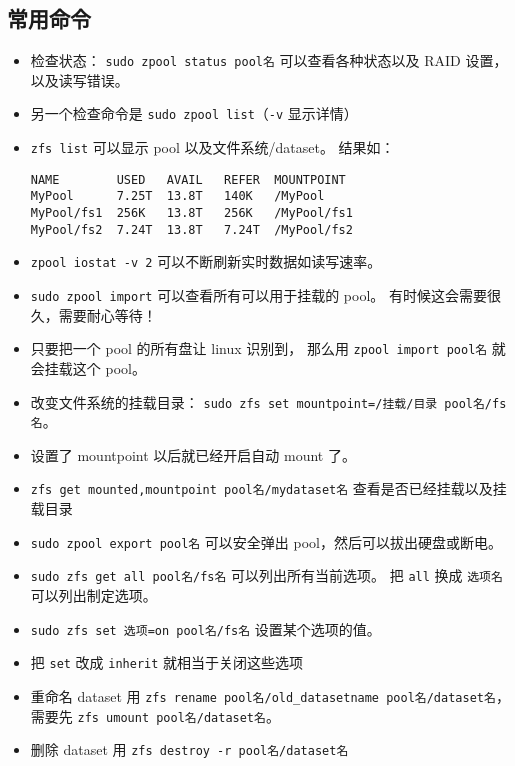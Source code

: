 \subsection{常用命令}
\begin{itemize}
\item 检查状态： \verb`sudo zpool status pool名` 可以查看各种状态以及 RAID 设置， 以及读写错误。
\item 另一个检查命令是 \verb`sudo zpool list`（\verb`-v` 显示详情）
\item \verb`zfs list` 可以显示 pool 以及文件系统/dataset。 结果如：
\begin{lstlisting}[language=none]
NAME        USED   AVAIL   REFER  MOUNTPOINT
MyPool      7.25T  13.8T   140K   /MyPool
MyPool/fs1  256K   13.8T   256K   /MyPool/fs1
MyPool/fs2  7.24T  13.8T   7.24T  /MyPool/fs2
\end{lstlisting}
\item \verb`zpool iostat -v 2` 可以不断刷新实时数据如读写速率。
\item \verb`sudo zpool import` 可以查看所有可以用于挂载的 pool。 有时候这会需要很久，需要耐心等待！
\item 只要把一个 pool 的所有盘让 linux 识别到， 那么用 \verb`zpool import pool名` 就会挂载这个 pool。
\item 改变文件系统的挂载目录： \verb`sudo zfs set mountpoint=/挂载/目录 pool名/fs名`。
\item 设置了 mountpoint 以后就已经开启自动 mount 了。
\item \verb`zfs get mounted,mountpoint pool名/mydataset名` 查看是否已经挂载以及挂载目录
\item \verb`sudo zpool export pool名` 可以安全弹出 pool，然后可以拔出硬盘或断电。
\item \verb`sudo zfs get all pool名/fs名` 可以列出所有当前选项。 把 \verb`all` 换成 \verb`选项名` 可以列出制定选项。
\item \verb`sudo zfs set 选项=on pool名/fs名` 设置某个选项的值。
\item 把 \verb`set` 改成 \verb`inherit` 就相当于关闭这些选项
\item 重命名 dataset 用 \verb`zfs rename pool名/old_datasetname pool名/dataset名`， 需要先 \verb`zfs umount pool名/dataset名`。
\item 删除 dataset 用 \verb`zfs destroy -r pool名/dataset名`
\end{itemize}



